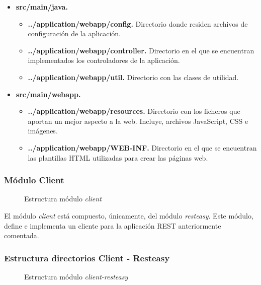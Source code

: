 \begin{itemize}
	\item \textbf{src/main/java. }
	\begin{itemize}
		\item \textbf{../application/webapp/config. } Directorio donde residen archivos de configuración de la aplicación.
		\item \textbf{../application/webapp/controller. } Directorio en el que se encuentran implementados los controladores de la aplicación.
		\item \textbf{../application/webapp/util. } Directorio con las clases de utilidad.
	\end{itemize}
	\item \textbf{src/main/webapp. }
	\begin{itemize}
		\item \textbf{../application/webapp/resources. } Directorio con los ficheros que aportan un mejor aspecto a la web. Incluye, archivos JavaScript, CSS e imágenes.
		\item \textbf{../application/webapp/WEB-INF. } Directorio en el que se encuentran las plantillas HTML utilizadas para crear las páginas web.
	\end{itemize}
\end{itemize}


\subsubsection*{Módulo Client}
\begin{figure}[H]
\centering
{}
\caption{Estructura módulo \textit{client}}
\end{figure}

El módulo \textit{client} está compuesto, únicamente, del módulo \textit{resteasy}. Este módulo, define e implementa un cliente para la aplicación REST anteriormente comentada.


\subsubsection*{Estructura directorios Client - Resteasy}
\begin{figure}[H]
\centering
{}
\caption{Estructura módulo \textit{client-resteasy}}
\end{figure}

